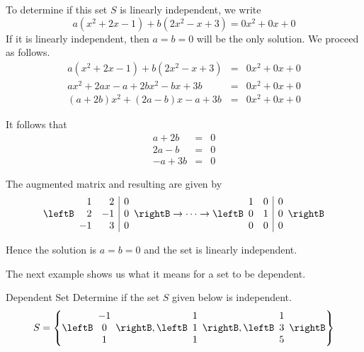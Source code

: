 \begin{solution}
To determine if this set $S$ is linearly independent, we write
\[
a ( x^2 + 2x -1 ) + b(2x^2 - x + 3) = 0x^2 + 0x + 0
\]
If it is linearly independent, then $a=b=0$ will be the only solution. We proceed as follows. 
\begin{eqnarray*}
a ( x^2 + 2x -1 ) + b(2x^2 - x + 3) &=& 0x^2 + 0x + 0 \\
ax^2 + 2ax - a + 2bx^2 - bx + 3b &=& 0x^2 + 0x + 0 \\
(a+2b)x^2 + (2a -b)x  - a + 3b &=&  0x^2 + 0x + 0
\end{eqnarray*}

It follows that
\begin{eqnarray*}
a + 2b &=& 0 \\
2a - b &=& 0 \\
-a + 3b &=& 0
\end{eqnarray*}

The augmented matrix and resulting \rref \;are given by
\[
\leftB \begin{array}{rr|r}
1 & 2 & 0 \\
2 & -1 & 0 \\
-1 & 3 & 0 
\end{array} \rightB 
\rightarrow \cdots \rightarrow
\leftB \begin{array}{rr|r}
1 & 0 & 0 \\
0 & 1 & 0 \\
0 & 0 & 0 
\end{array} \rightB 
\]

Hence the solution is $a=b=0$ and the set is linearly independent. 
\end{solution}

The next example shows us what it means for a set to be dependent.

\begin{example}{Dependent Set}\label{exa:dependent}
Determine if the set $S$ given below is independent. 
\[
S=\left\{
\leftB\begin{array}{c} -1 \\ 0 \\ 1 \end{array}\rightB,
\leftB\begin{array}{c} 1 \\ 1 \\ 1 \end{array}\rightB,
\leftB\begin{array}{c} 1 \\ 3 \\ 5 \end{array}\rightB \right\}
\]
\end{example}

